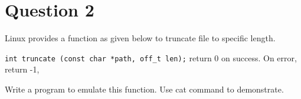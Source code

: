 \documentclass[main.tex]{subfiles}
\begin{document}
\section{Question 2}

Linux provides a function as given below to truncate file to specific length.

\texttt{int truncate (const char *path, off\_t len);} return 0 on success. On error, return -1,

Write a program to emulate this function. Use cat command to demonstrate.




\end{document}

